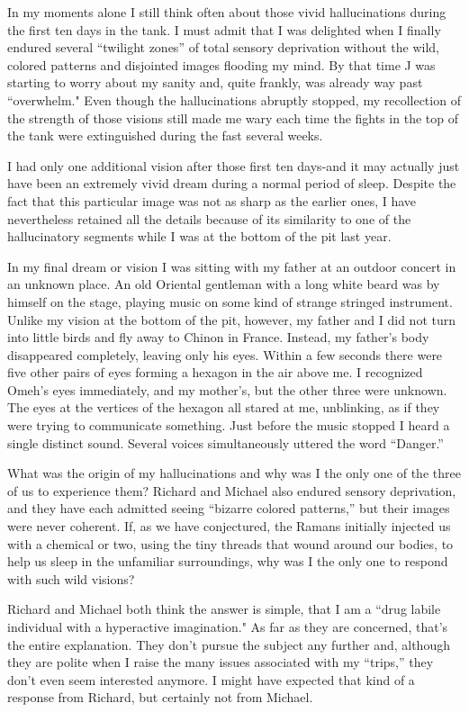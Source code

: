 \documentclass[]{article}
\begin{document}
In my moments alone I still think often about those vivid hallucinations during the first ten days in the tank.  I must admit that I was delighted when I finally endured several “twilight zones” of total sensory deprivation without the wild, colored patterns and disjointed images flooding my mind.  By that time J was starting to worry about my sanity and, quite frankly, was already way past “overwhelm."  Even though the hallucinations abruptly stopped, my recollection of the strength of those visions still made me wary each time the fights in the top of the tank were extinguished during the fast several weeks.

I had only one additional vision after those first ten days-and it may actually just have been an extremely vivid dream during a normal period of sleep.  Despite the fact that this particular image was not as sharp as the earlier ones, I have nevertheless retained all the details because of its similarity to one of the hallucinatory segments while I was at the bottom of the pit last year.

In my final dream or vision I was sitting with my father at an outdoor concert in an unknown place.  An old Oriental gentleman with a long white beard was by himself on the stage, playing music on some kind of strange stringed instrument.  Unlike my vision at the bottom of the pit, however, my father and I did not turn into little birds and fly away to Chinon in France.  Instead, my father’s body disappeared completely, leaving only his eyes.  Within a few seconds there were five other pairs of eyes forming a hexagon in the air above me.  I recognized Omeh’s eyes immediately, and my mother’s, but the other three were unknown.  The eyes at the vertices of the hexagon all stared at me, unblinking, as if they were trying to communicate something.  Just before the music stopped I heard a single distinct sound.  Several voices simultaneously uttered the word “Danger.”

What was the origin of my hallucinations and why was I the only one of the three of us to experience them? Richard and Michael also endured sensory deprivation, and they have each admitted seeing “bizarre colored patterns,” but their images were never coherent.  If, as we have conjectured, the Ramans initially injected us with a chemical or two, using the tiny threads that wound around our bodies, to help us sleep in the unfamiliar surroundings, why was I the only one to respond with such wild visions?

Richard and Michael both think the answer is simple, that I am a “drug labile individual with a hyperactive imagination."  As far as they are concerned, that’s the entire explanation.  They don’t pursue the subject any further and, although they are polite when I raise the many issues associated with my “trips,” they don’t even seem interested anymore.  I might have expected that kind of a response from Richard, but certainly not from Michael.
\end{document}
